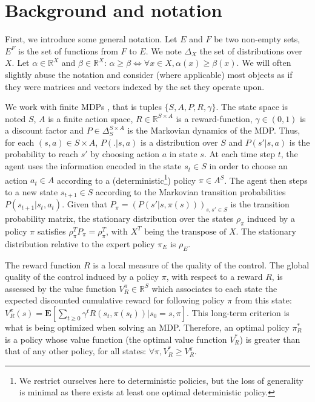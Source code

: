 \documentclass{llncs}
\newcommand{\E}{\mathbf{E}}
\begin{document}
\section{Background and notation}
\label{sec:background}
First, we introduce some general notation.
Let $E$ and $F$ be two non-empty sets, $E^F$ is the set of functions from $F$ to $E$.
We note $\Delta_X$ the set of distributions over $X$.
Let $\alpha\in\mathbb{R}^X$ and $\beta\in\mathbb{R}^X$: $\alpha\geq\beta \Leftrightarrow \forall x\in X, \alpha(x) \geq \beta(x)$. We will often slightly abuse the notation and consider (where applicable) most objects as if they were matrices and vectors indexed by the set they operate upon.

We work with finite MDPs \cite{puterman1994markov}, that is tuples $\{S,A,P,R,\gamma\}$. The state space is noted $S$, $A$ is a finite action space, $R\in\mathbb{R}^{S\times A}$ is a reward-function, $\gamma\in (0,1)$ is a discount factor and $P\in \Delta_{S}^{S\times A}$ is the Markovian dynamics of the MDP. Thus, for each $(s,a)\in S\times A$, $P(.|s,a)$ is a distribution over $S$ and $P(s'|s,a)$ is the probability to reach $s'$ by choosing action $a$ in state $s$. At each time step $t$, the agent uses the information encoded in the state $s_t\in S$ in order to choose an action $a_t \in A$ according to a (deterministic\footnote{We restrict ourselves here to deterministic policies, but the loss of generality is minimal as there exists at least one optimal deterministic policy.}) policy $\pi\in A^S$. The agent then steps to a new state $s_{t+1}\in S$ according to the Markovian transition probabilities $P(s_{t+1}|s_t,a_t)$. Given that $P_\pi = (P(s'|s,\pi(s)))_{s,s' \in S}$ is the transition probability matrix, the stationary distribution over the states $\rho_\pi$ induced by a policy $\pi$ satisfies $\rho_\pi^TP_\pi = \rho_\pi^T\textrm{, with }X^T\textrm{ being the transpose of }X$.
The stationary distribution relative to the expert policy $\pi_E$ is $\rho_E$.

The reward function $R$ is a local measure of the quality of the control. The global quality of the control induced by a policy $\pi$, with respect to a reward $R$, is assessed by the value function $V^\pi_R \in \mathbb{R}^{S}$ which associates to each state the expected discounted cumulative reward for following policy $\pi$ from this state:
$V^\pi_R(s) = \E[\sum_{t\geq 0}\gamma^tR(s_t,\pi(s_t))|s_0 = s,\pi]$.
This long-term criterion is what is being optimized when solving an MDP. Therefore, an optimal policy $\pi^*_R$ is a policy whose value function (the optimal value function $V^*_R$) is greater than that of any other policy, for all states: $\forall \pi, V^*_R\geq V^\pi_R$.
\end{document}

